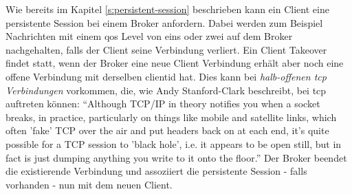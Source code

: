  \label{s:client-takeover}
Wie bereits im Kapitel \ref{s:persistent-session} beschrieben kann ein Client eine persistente Session bei einem Broker anfordern. Dabei werden zum Beispiel Nachrichten mit einem \ac{qos} Level von eins oder zwei auf dem Broker nachgehalten, falls der Client seine Verbindung verliert. Ein Client Takeover findet statt, wenn der Broker eine neue Client Verbindung erhält aber noch eine offene Verbindung mit derselben \ac{clientid} hat. Dies kann bei \textit{halb-offenen \acs{tcp} Verbindungen} vorkommen, die, wie Andy Stanford-Clark beschreibt, bei \ac{tcp} auftreten können:\newline
``Although TCP/IP in theory notifies you when a socket breaks, in practice, particularly on things like mobile and satellite links, which often 'fake' TCP over the air and put headers back on at each end, it’s quite possible for a TCP session to 'black hole', i.e. it appears to be open still, but in fact is just dumping anything you write to it onto the floor.''\cite{WhyKeepaliveNeeded}\newline
Der Broker beendet die existierende Verbindung und assoziiert die persistente Session - falls vorhanden - nun mit dem neuen Client.
\cite{teamKeepAliveClient}
\newpage

